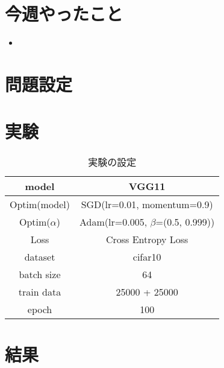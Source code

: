 \documentclass[twocolumn]{jarticle}     %
\begin{document}


\section{今週やったこと}
\begin{itemize}
	\item
\end{itemize}

\section{問題設定}

\section{実験}

\begin{table}[tb]
  \begin{center}
    \caption{実験の設定}
    \begin{tabular}{|c|c|} \hline
      model & VGG11 \\ \hline
      Optim(model) & SGD(lr=0.01, momentum=0.9) \\ \hline
      Optim($\alpha$) & Adam(lr=0.005, $\beta$=(0.5, 0.999)) \\ \hline
      Loss & Cross Entropy Loss \\ \hline
      dataset & cifar10 \\ \hline
      batch size & 64 \\ \hline
      train data & 25000 + 25000 \\ \hline
      epoch & 100 \\ \hline
    \end{tabular}
    \label{tab:setting}
  \end{center}
\end{table}

\section{結果}
\end{document}
